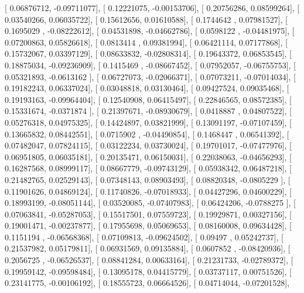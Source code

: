 \documentclass{article}
\begin{document}
       [ 0.06876712, -0.09711077],
       [ 0.12221075, -0.00153706],
       [ 0.20756286,  0.08599264],
       [ 0.03540266,  0.06035722],
       [ 0.15612656,  0.01610588],
       [ 0.1744642 ,  0.07981527],
       [ 0.1695029 , -0.08222612],
       [ 0.04531898, -0.04662786],
       [ 0.0598122 , -0.04481975],
       [ 0.07200863,  0.05826618],
       [ 0.0813414 ,  0.09381994],
       [ 0.06421114,  0.07177868],
       [ 0.15732067,  0.03397129],
       [ 0.08633832, -0.02808314],
       [ 0.19643372,  0.06853545],
       [ 0.18875034, -0.09236909],
       [ 0.1415469 , -0.08667452],
       [ 0.07952057, -0.06755753],
       [ 0.05321893, -0.0613162 ],
       [ 0.06727073, -0.02066371],
       [ 0.07073211, -0.07014034],
       [ 0.19182243,  0.06337024],
       [ 0.03048818,  0.03130464],
       [ 0.09427524,  0.09035468],
       [ 0.19193163, -0.09964404],
       [ 0.12540908,  0.06415497],
       [ 0.22846565,  0.08572385],
       [ 0.15331674, -0.0371874 ],
       [ 0.21397671, -0.08930679],
       [ 0.0418887 ,  0.04807522],
       [ 0.05276318,  0.04975325],
       [ 0.14424897,  0.03821999],
       [ 0.13091197, -0.07107459],
       [ 0.13665832,  0.08442551],
       [ 0.0715902 , -0.04490854],
       [ 0.1468447 ,  0.06541392],
       [ 0.07482047,  0.07824115],
       [ 0.03122234,  0.03730024],
       [ 0.19701017, -0.07477976],
       [ 0.06951805,  0.06035181],
       [ 0.20135471,  0.06150031],
       [ 0.22038063, -0.04656293],
       [ 0.16287568,  0.08999117],
       [ 0.08667779, -0.09743129],
       [ 0.05938342,  0.06487218],
       [ 0.21482765,  0.02529143],
       [ 0.07348143,  0.08903493],
       [ 0.08820348, -0.0805229 ],
       [ 0.11901626,  0.04869124],
       [ 0.11740826, -0.07018933],
       [ 0.04427296,  0.04600229],
       [ 0.18993199, -0.08051144],
       [ 0.03520085, -0.07407983],
       [ 0.06424206, -0.0788275 ],
       [ 0.07063841, -0.05287053],
       [ 0.15517501,  0.07559723],
       [ 0.19929871,  0.00327156],
       [ 0.19001471, -0.00237877],
       [ 0.17955698,  0.05069653],
       [ 0.08160008,  0.09634428],
       [ 0.1151194 , -0.06568368],
       [ 0.07109813, -0.09624502],
       [ 0.09497   ,  0.05242737],
       [ 0.21537982,  0.05179811],
       [ 0.06931569,  0.09135884],
       [ 0.0607852 , -0.08420936],
       [ 0.2056725 , -0.06526537],
       [ 0.08841284,  0.00633164],
       [ 0.21231733, -0.02789372],
       [ 0.19959142, -0.09598484],
       [ 0.13095178,  0.04415779],
       [ 0.03737117,  0.00751526],
       [ 0.23141775, -0.00106192],
       [ 0.18555723,  0.06664526],
       [ 0.04714044, -0.07201528],
\end{document}
